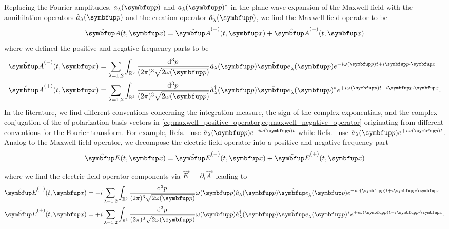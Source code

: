 Replacing the Fourier amplitudes, $a_\lambda(\vb{p})$ and $a_\lambda(\vb{p})^*$ in the plane-wave expansion of the Maxwell field with the annihilation operators $\hat{a}_\lambda(\vb{p})$ and the creation operator $\hat{a}_\lambda^\dagger(\vb{p})$, we find the Maxwell field operator to be
\begin{equation}
	\vu{A}(t,\vb{x})
	=
	\vu{A}^{(-)}(t,\vb{x})
	+
	\vu{A}^{(+)}(t,\vb{x})
	\label{eq:maxwell_operator}
\end{equation}
where we defined the positive and negative frequency parts to be
\begin{align}
	\vu{A}^{(-)}(t,\vb{x})
	&=
	\sum_{\lambda=1,2}
	\int_{\mathbb{R}^3}\frac{\dd[3]{p}}{(2\pi)^3\sqrt{2\omega(\vb{p})}}
	\hat{a}_\lambda(\vb{p})
	\vu{e}_\lambda(\vb{p})
	e^{-i\omega(\vb{p})t+i\vb{p}\vdot\vb{x}}
	\label{eq:maxwell_negative_operator}
	\\
	\vu{A}^{(+)}(t,\vb{x})
	&=
	\sum_{\lambda=1,2}
	\int_{\mathbb{R}^3}\frac{\dd[3]{p}}{(2\pi)^3\sqrt{2\omega(\vb{p})}}
	\hat{a}_\lambda^\dagger(\vb{p})
	\vu{e}_\lambda(\vb{p})^*
	e^{+i\omega(\vb{p})t-i\vb{p}\vdot\vb{x}}
	\label{eq:maxwell_positive_operator}
	.
\end{align}
In the literature, we find different conventions concerning the integration measure, the sign of the complex exponentials, and the complex conjugation of the of polarization basis vectors in \cref{eq:maxwell_positive_operator,eq:maxwell_negative_operator} originating from different conventions for the Fourier transform.
For example, Refs.~\cite{Peskin1995,Greiner2013} use $\hat{a}_\lambda(\vb{p})e^{-i\omega(\vb{p})t}$ while Refs.~\cite{Srednicki2007,Weinberg1995} use $\hat{a}_\lambda(\vb{p})e^{+i\omega(\vb{p})t}$.
Analog to the Maxwell field operator, we decompose the electric field operator into a positive and negative frequency part
\begin{equation}
	\vu{E}(t,\vb{x})
	=
	\vu{E}^{(-)}(t,\vb{x})
	+
	\vu{E}^{(+)}(t,\vb{x})
	\label{eq:electric_operator}
\end{equation}
where we find the electric field operator components via $\hat{E}^i=\partial_t\hat{A}^i$ leading to
\begin{align}
	\vu{E}^{(-)}(t,\vb{x})
	&=
	-i
	\sum_{\lambda=1,2}
	\int_{\mathbb{R}^3}\frac{\dd[3]{p}}{(2\pi)^3\sqrt{2\omega(\vb{p})}}
	\omega(\vb{p})
	\hat{a}_\lambda(\vb{p})
	\vu{e}_\lambda(\vb{p})
	e^{-i\omega(\vb{p})t+i\vb{p}\vdot\vb{x}}
	\label{eq:electric_negative_operator}
	\\
	\vu{E}^{(+)}(t,\vb{x})
	&=
	+i
	\sum_{\lambda=1,2}
	\int_{\mathbb{R}^3}\frac{\dd[3]{p}}{(2\pi)^3\sqrt{2\omega(\vb{p})}}
	\omega(\vb{p})
	\hat{a}_\lambda^\dagger(\vb{p})
	\vu{e}_\lambda(\vb{p})^*
	e^{+i\omega(\vb{p})t-i\vb{p}\vdot\vb{x}}
	\label{eq:electric_positive_operator}
	.
\end{align}
